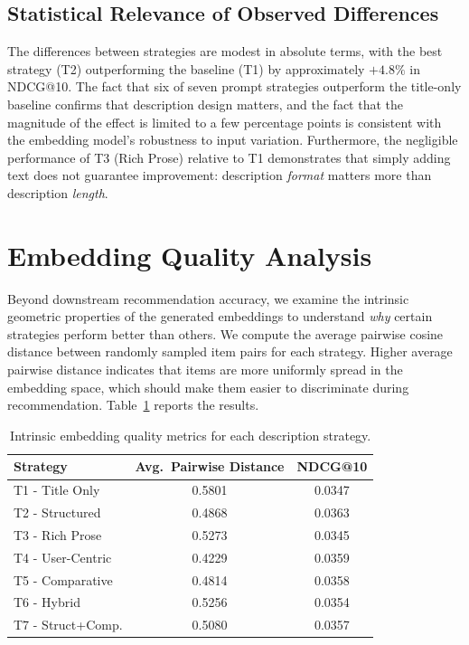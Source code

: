 \documentclass[12pt,a4paper]{report}
\begin{document}
\subsection*{Statistical Relevance of Observed Differences}

\justifying
The differences between strategies are modest in absolute terms, with the
best strategy (T2) outperforming the baseline (T1) by approximately
\(+4.8\%\) in NDCG@10. The fact that six of seven prompt strategies outperform
the title-only baseline confirms that description design matters, and the fact
that the magnitude of the effect is limited to a few percentage points is
consistent with the embedding model's robustness to input variation.
Furthermore, the negligible performance of T3 (Rich Prose) relative to T1
demonstrates that simply adding text does not guarantee improvement: description
\emph{format} matters more than description \emph{length}.

\section{Embedding Quality Analysis}
\label{sec:embedding_quality}

\justifying
Beyond downstream recommendation accuracy, we examine the intrinsic geometric
properties of the generated embeddings to understand \emph{why} certain
strategies perform better than others. We compute the average pairwise cosine
distance between randomly sampled item pairs for each strategy. Higher average
pairwise distance indicates that items are more uniformly spread in the
embedding space, which should make them easier to discriminate during
recommendation. Table~\ref{tab:embedding_quality} reports the results.

\begin{table}[h]
\centering
\caption{Intrinsic embedding quality metrics for each description strategy.}
\label{tab:embedding_quality}
\begin{tabular}{p{2.6cm} c c}
\toprule
\textbf{Strategy} & \textbf{Avg.\ Pairwise Distance} & \textbf{NDCG@10} \\
\midrule
T1 - Title Only    & 0.5801 & 0.0347 \\
T2 - Structured    & 0.4868 & 0.0363 \\
T3 - Rich Prose    & 0.5273 & 0.0345 \\
T4 - User-Centric  & 0.4229 & 0.0359 \\
T5 - Comparative   & 0.4814 & 0.0358 \\
T6 - Hybrid        & 0.5256 & 0.0354 \\
T7 - Struct+Comp.  & 0.5080 & 0.0357 \\
\bottomrule
\end{tabular}
\end{table}
\end{document}
